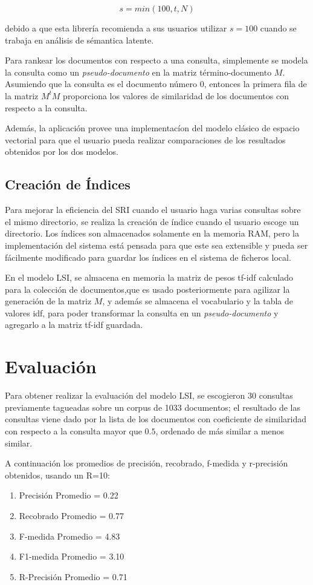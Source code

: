\documentclass[a4paper, 10pt]{article}
\begin{document}
	\begin{equation}
		s = min(100, t, N)	
	\end{equation}

	debido a que esta librer\'ia recomienda a sus usuarios utilizar $s = 100$ cuando se trabaja en an\'alisis de s\'emantica latente.

	Para rankear los documentos con respecto a una consulta, simplemente se modela la consulta como un \textit{pseudo-documento} en la matriz t\'ermino-documento $M$. Asumiendo que la consulta es el documento n\'umero 0, entonces la primera fila de la matriz $M^tM$ proporciona los valores de similaridad de los documentos con respecto a la consulta.

	Adem\'as, la aplicaci\'on provee una implementac\'ion del modelo cl\'asico de espacio vectorial para que el usuario pueda realizar comparaciones de los resultados obtenidos por los dos modelos.

	\subsection{Creaci\'on de \'Indices}
	Para mejorar la eficiencia del SRI cuando el usuario haga varias consultas sobre el mismo directorio, se realiza la creaci\'on de \'indice cuando el usuario escoge un directorio. Los \'indices son almacenados solamente en la memoria RAM, pero la implementaci\'on del sistema est\'a pensada para que este sea extensible y pueda ser f\'acilmente modificado para guardar los \'indices en el sistema de ficheros local.

	En el modelo LSI, se almacena en memoria la matriz de pesos tf-idf calculado para la colecci\'on de documentos,que es usado posteriormente para agilizar la generaci\'on de la matriz $M$, y adem\'as se almacena el vocabulario y la tabla de valores idf, para poder transformar la consulta en un \textit{pseudo-documento} y agregarlo a la matriz tf-idf guardada.
	
	\section{Evaluación}
	Para obtener realizar la evaluaci\'on del modelo LSI, se escogieron 30 consultas previamente tagueadas sobre un corpus de 1033 documentos; el resultado de las consultas viene dado por la lista de los documentos con coeficiente de similaridad con respecto a la consulta mayor que $0.5$, ordenado de m\'as similar a menos similar.
	
	A continuación los promedios de precisión, recobrado, f-medida y r-precisión obtenidos, usando un R=10:
	\begin{enumerate}
       \item Precisión Promedio = 0.22
        \item Recobrado Promedio = 0.77
        \item F-medida Promedio = 4.83
        \item F1-medida Promedio = 3.10
        \item R-Precisión Promedio = 0.71

    \end{enumerate}
\end{document}
